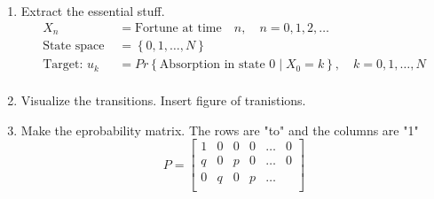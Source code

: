 \documentclass{article}
\theoremstyle{remark}
\begin{document}
\begin{enumerate}
  \item Extract the essential stuff. \[
      \begin{split}
        X_{n} &=  \text{Fortune at time} \quad  n, \quad n = 0,1,2,\ldots   \\
        \text{State space } &=  \left\{ 0,1, \ldots, N \right\} \\
        \text{Target: } u_{k}   & = Pr \left \{ \text{Absorption in state 0}  \mid X_{0} = k \right \}, \quad  k = 0,1, \ldots, N \\
      \end{split} 
  \] 
\item  Visualize the transitions.  Insert figure of tranistions.
   \item Make the eprobability matrix. The rows are "to" and the columns are "1"
     \[
     P = \begin{bmatrix} 
     1   &  0 & 0 & 0  & \ldots  &  0 \\
     q  & 0  &   p  & 0  &   \ldots  &  0 \\
     0  &  q  &   0  &  p  &  \ldots   \\
     

\end{bmatrix}\]
\end{enumerate}
\end{document}
